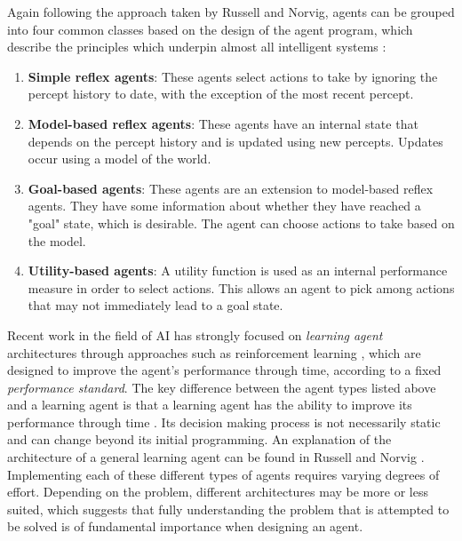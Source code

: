  

Again following the approach taken by Russell and Norvig, agents can be grouped into four common classes based on the design of the agent program, which describe the principles which underpin almost all intelligent systems \cite[p.~47]{AIAMA}: 
\begin{enumerate}
    \item \textbf{Simple reflex agents}: These agents select actions to take by ignoring the percept history to date, with the exception of the most recent percept.
    \item \textbf{Model-based reflex agents}: These agents have an internal state that depends on the percept history and is updated using new percepts. Updates occur using a model of the world.
    \item \textbf{Goal-based agents}: These agents are an extension to model-based reflex agents. They have some information about whether they have reached a "goal" state, which is desirable. The agent can choose actions to take based on the model. 
    \item \textbf{Utility-based agents}: A utility function is used as an internal performance measure in order to select actions. This allows an agent to pick among actions that may not immediately lead to a goal state.
\end{enumerate}
\par Recent work in the field of AI has strongly focused on \textit{learning agent} architectures through approaches such as reinforcement learning \cite{Sutton1998}, which are designed to improve the agent's performance through time, according to a fixed \textit{performance standard}. The key difference between the agent types listed above and a learning agent is that a learning agent has the ability to improve its performance through time \cite{AIAMA}. Its decision making process is not necessarily static and can change beyond its initial programming. An explanation of the architecture of a general learning agent can be found in Russell and Norvig \cite[p.~55]{AIAMA}. Implementing each of these different types of agents requires varying degrees of effort. Depending on the problem, different architectures may be more or less suited, which suggests that fully understanding the problem that is attempted to be solved is of fundamental importance when designing an agent.

